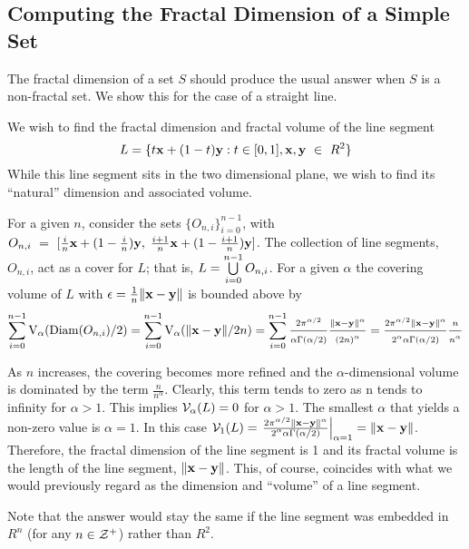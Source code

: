 {\subsection{Computing the Fractal Dimension of a Simple Set}

The fractal dimension of a set $S$ should produce the usual
answer when $S$ is a non-fractal set. We show this for the case of a
straight line.

We wish to find the fractal dimension and fractal volume of the line
segment 
$$
L = \{t{\bf x} + (1-t){\bf y} : t \in [0,1] , {\bf x, y}~\in~R^2\}
$$
While this line segment sits in the two dimensional plane, we wish 
to find its ``natural'' dimension and associated volume.

For a given $n$, consider the sets $\{O_{n,i}\}_{i=0}^{n-1}$, with $O_{n,i}~=~
[\frac{i}{n}{\bf x} + (1-\frac{i}{n}){\bf y}, \; \frac{i+1}{n}{\bf x} + (1 -
\frac{i+1}{n}){\bf y}]$. The collection of line segments, $O_{n,i}$, act
as a cover for $L$; that is, $L =
\bigcup_{i=0}^{n-1}\limits O_{n,i}$. For a given $\alpha$ the
covering volume of $L$ with $\epsilon = \frac{1}{n} \|{\bf x} - {\bf y}\|$ 
is bounded above by
$$
\sum_{i=0}^{n-1} {\rm V}_\alpha({\rm Diam}(O_{n,i})/2) = \sum_{i=0}^{n-1}
{\rm V}_\alpha(\|{\bf x} - {\bf y}\|/2n) =  \sum_{i=0}^{n-1} \frac{2
\pi^{\alpha / 2}}{\alpha \Gamma(\alpha / 2)} \frac{\|{\bf x} - {\bf
y}\|^\alpha}{(2n)^\alpha} = \frac{2 \pi^{\alpha / 2} \|{\bf x} - {\bf
y}\|^\alpha}{2^\alpha \alpha \Gamma(\alpha / 2)} \frac{n}{n^\alpha}
$$

As $n$ increases, the covering becomes more refined and 
the $\alpha$-dimensional volume is dominated by the term
$\frac{n}{n^\alpha}$. Clearly, this term tends to zero as n tends to
infinity for $\alpha > 1$. This implies ${\cal V}_\alpha(L) = 0$ 
for $\alpha > 1$. The smallest $\alpha$ that yields a non-zero 
value is $\alpha = 1$. In this case 
${\cal V}_1(L) = \left. \frac{2\pi^{\alpha / 2} \|{\bf x} - {\bf
y}\|^\alpha}{2^\alpha \alpha \Gamma(\alpha / 2)} \right|_{\alpha=1} = \| {\bf
x} - {\bf y}\|$. 
Therefore, the fractal dimension of the line segment is
1 and its fractal volume is the length of the line segment, $\|{\bf x} - {\bf
y}\|$. This, of course, coincides with what we would previously regard
as the dimension and ``volume'' of a line segment.

Note that the answer would stay the same if the line segment was 
embedded in $R^n$ (for any $n \in {\cal Z}^+$) rather than $R^2$.


}
